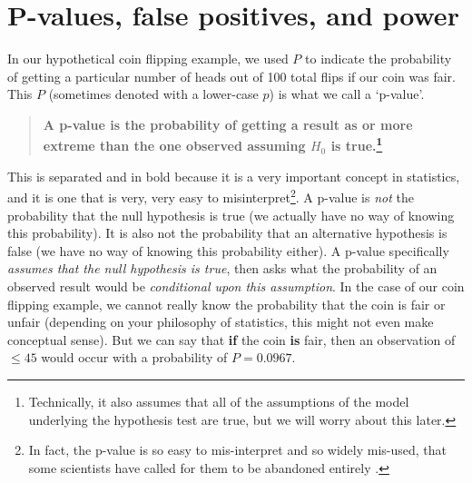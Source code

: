 \documentclass[
]{scrbook}
\begin{document}
\hypertarget{p-values-false-positives-and-power}{%
\section{P-values, false positives, and power}\label{p-values-false-positives-and-power}}

In our hypothetical coin flipping example, we used \(P\) to indicate the probability of getting a particular number of heads out of 100 total flips if our coin was fair.
This \(P\) (sometimes denoted with a lower-case \(p\)) is what we call a `p-value'.

\begin{quote}
\textbf{A p-value is the probability of getting a result as or more extreme than the one observed assuming \(H_{0}\) is true.\footnote{Technically, it also assumes that all of the assumptions of the model underlying the hypothesis test are true, but we will worry about this later.}}
\end{quote}

This is separated and in bold because it is a very important concept in statistics, and it is one that is very, very easy to misinterpret\footnote{In fact, the p-value is so easy to mis-interpret and so widely mis-used, that some scientists have called for them to be abandoned entirely \citetext{\citealp{Wasserstein2016}; \citealp[but see][]{Stanton-Geddes2014}; \citealp{Mayo2019}}.}.
A p-value is \emph{not} the probability that the null hypothesis is true (we actually have no way of knowing this probability).
It is also not the probability that an alternative hypothesis is false (we have no way of knowing this probability either).
A p-value specifically \emph{assumes that the null hypothesis is true}, then asks what the probability of an observed result would be \emph{conditional upon this assumption}.
In the case of our coin flipping example, we cannot really know the probability that the coin is fair or unfair (depending on your philosophy of statistics, this might not even make conceptual sense).
But we can say that \textbf{if} the coin \textbf{is} fair, then an observation of \(\leq 45\) would occur with a probability of \(P = 0.0967\).
\end{document}
